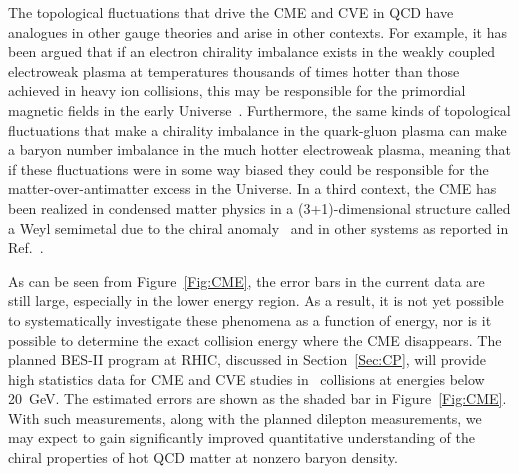 
The topological fluctuations that drive the CME and CVE in QCD have
analogues in other gauge theories and arise in other contexts.  For
example,
it has been argued that if an electron chirality imbalance exists in
the weakly coupled electroweak plasma at temperatures thousands of
times hotter than those achieved in heavy ion collisions, this may be
responsible for the primordial magnetic fields in the early
Universe~\cite{Joyce:1997uy}.  Furthermore, the same kinds of
topological fluctuations that make a chirality imbalance in the
quark-gluon plasma can make a baryon number imbalance in the much
hotter electroweak plasma, meaning that if these fluctuations were in
some way biased they could be responsible for the
matter-over-antimatter excess in the Universe.  In a third context,
the CME has been realized in condensed matter physics in a
(3+1)-dimensional structure called a Weyl semimetal due to the chiral
anomaly~\cite{Wan:2011aa} and in other systems as reported in
Ref.~\cite{Perks:2012aa}.
  
As can be seen from Figure~\ref{Fig:CME}, the error bars in the current
data are still large, especially in the lower energy region. As a
result, it is not yet possible to systematically investigate these
phenomena as a function of energy, nor is it possible to
determine the exact collision energy where the CME disappears. The
planned BES-II program at RHIC, discussed in Section~\ref{Sec:CP},
will provide high statistics data for CME and CVE studies in
\AuAu\ collisions at energies below 20~GeV. The estimated errors are
shown as the shaded bar in Figure~\ref{Fig:CME}.  With such
measurements, along with the planned dilepton measurements, we may
expect to gain significantly improved quantitative understanding of
the chiral properties of hot QCD matter at nonzero baryon density.
 



